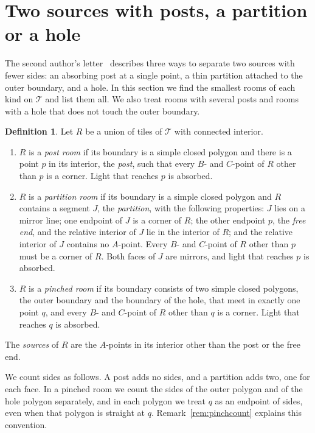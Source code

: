 \documentclass[11pt,a4paper]{article}
\theoremstyle{plain}
\theoremstyle{definition}
\newtheorem{definition}[theorem]{Definition}
\theoremstyle{remark}
\newcommand{\T}{\mathcal{T}}
\numberwithin{equation}{section}
\begin{document}
\section{Two sources with posts, a partition or a hole}\label{sec:devices}

The second author's letter~\cite[Figure~3]{Tok96} describes three ways to separate two sources with fewer sides: an absorbing post at a single point, a thin partition attached to the outer boundary, and a hole. In this section we find the smallest rooms of each kind on $\T$ and list them all. We also treat rooms with several posts and rooms with a hole that does not touch the outer boundary.

\begin{definition}\label{def:devices}
Let $R$ be a union of tiles of $\T$ with connected interior.
\begin{enumerate}[label=\textup{(\alph*)}]
\item $R$ is a \emph{post room} if its boundary is a simple closed polygon and there is a point $p$ in its interior, the \emph{post}, such that every $B$- and $C$-point of $R$ other than $p$ is a corner. Light that reaches $p$ is absorbed.
\item $R$ is a \emph{partition room} if its boundary is a simple closed polygon and $R$ contains a segment $J$, the \emph{partition}, with the following properties: $J$ lies on a mirror line; one endpoint of $J$ is a corner of $R$; the other endpoint $p$, the \emph{free end}, and the relative interior of $J$ lie in the interior of $R$; and the relative interior of $J$ contains no $A$-point. Every $B$- and $C$-point of $R$ other than $p$ must be a corner of $R$. Both faces of $J$ are mirrors, and light that reaches $p$ is absorbed.
\item $R$ is a \emph{pinched room} if its boundary consists of two simple closed polygons, the outer boundary and the boundary of the hole, that meet in exactly one point $q$, and every $B$- and $C$-point of $R$ other than $q$ is a corner. Light that reaches $q$ is absorbed.
\end{enumerate}
The \emph{sources} of $R$ are the $A$-points in its interior other than the post or the free end.
\end{definition}

We count sides as follows. A post adds no sides, and a partition adds two, one for each face. In a pinched room we count the sides of the outer polygon and of the hole polygon separately, and in each polygon we treat $q$ as an endpoint of sides, even when that polygon is straight at $q$. Remark~\ref{rem:pinchcount} explains this convention.
\end{document}
